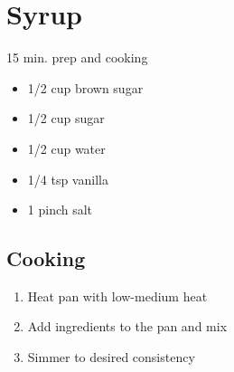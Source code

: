 \documentclass{article}
\begin{document}
\section{Syrup}

15 min. prep and cooking

\begin{itemize}
\item 1/2 cup brown sugar
\item 1/2 cup sugar
\item 1/2 cup water
\item 1/4 tsp vanilla
\item 1 pinch salt
\end{itemize}

\subsection{Cooking}

\begin{enumerate}
\item Heat pan with low-medium heat
\item Add ingredients to the pan and mix
\item Simmer to desired consistency
\end{enumerate}
\end{document}
